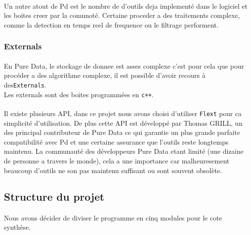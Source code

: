 \documentclass[a4paper, titlepage, oneside, 12pt]{article}%
\begin{document}
\paragraph{}
Un autre atout de Pd est le nombre de d'outils deja implementé dans le logiciel et les boites creer par la comunoté. Certaine proceder a des traitements complexe, comme la detection en temps reel de frequence ou le filtrage performent.

\subsubsection{Externals}
\paragraph{}
En Pure Data, le stockage de donnee est asses complexe c'est pour cela que pour procéder a des algorithme complexe, il est possible d'avoir recours à des\texttt{Externals}.\\
Les externals sont des boites programmées en \texttt{c++}. 

\paragraph{}
Il existe plusieurs API, dans ce projet nous avons choisi d'utiliser \texttt{Flext} pour ca simplicité d'utilisation. De plus cette API est développé par Thomas GRILL, un des principal contributeur de Pure Data ce qui garantie un plus grande parfaite compatibilité avec Pd et une certaine assurance que l'outils reste longtemps maintenu. La communauté des développeurs Pure Data etant limité (une dizaine de personne a travers le monde), cela a une importance car malheuresement beaucoup d'outils ne son pas maintenu suffisant ou sont souvent obsolète.  


\subsection{Structure du projet}
\paragraph{}
Nous avons décider de diviser le programme en cinq modules pour le cote synthèse.
\end{document}
